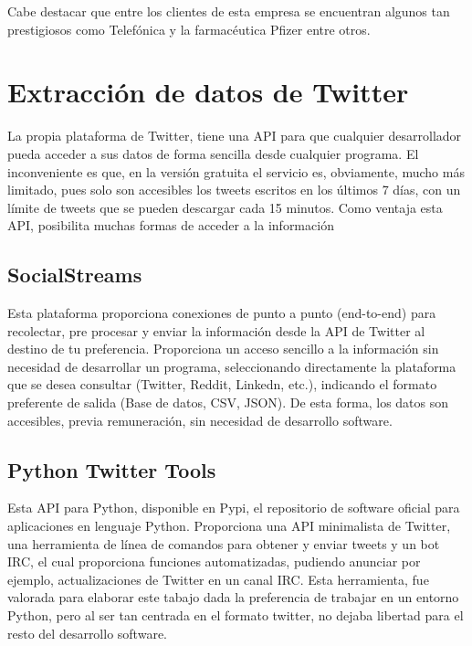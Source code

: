 Cabe destacar que entre los clientes de esta empresa se encuentran algunos tan prestigiosos como Telefónica y la farmacéutica Pfizer entre otros. 





\section{Extracción de datos de Twitter}

La propia plataforma de Twitter, tiene una API para que cualquier desarrollador pueda acceder a sus datos de forma sencilla desde cualquier programa. El inconveniente es que, en la versión gratuita el servicio es, obviamente, mucho más limitado, pues solo son accesibles los tweets escritos en los últimos 7 días, con un límite de tweets que se pueden descargar cada 15 minutos. Como ventaja esta API, posibilita muchas formas de acceder a la información

\subsection{SocialStreams\cite{SocialStreams}} 
Esta plataforma proporciona conexiones de punto a punto (end-to-end) para recolectar, pre procesar y enviar la información desde la API de Twitter al destino de tu preferencia. Proporciona un acceso sencillo a la información sin necesidad de desarrollar un programa, seleccionando directamente la plataforma que se desea consultar (Twitter, Reddit, Linkedn, etc.), indicando el formato preferente de salida (Base de datos, CSV, JSON). De esta forma, los datos son accesibles, previa remuneración, sin necesidad de desarrollo software. 

\subsection{Python Twitter Tools\cite{PythonTwitter}}

Esta API para Python, disponible en Pypi, el repositorio de software oficial para aplicaciones en lenguaje Python. Proporciona una API minimalista de Twitter, una herramienta de línea de comandos para obtener y enviar tweets y un bot IRC, el cual proporciona funciones automatizadas, pudiendo anunciar por ejemplo, actualizaciones de Twitter en un canal IRC. Esta herramienta, fue valorada para elaborar este tabajo dada la preferencia de trabajar en un entorno Python, pero al ser tan centrada en el formato twitter, no dejaba libertad para el resto del desarrollo software.

